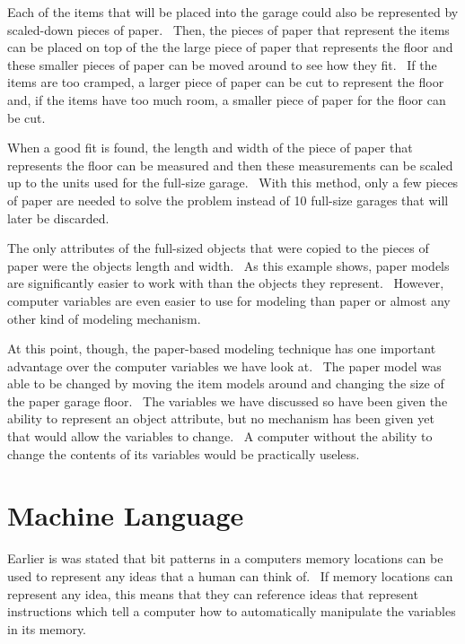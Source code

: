\documentclass[12pt,twoside]{book}
\begin{document}
\bigskip

Each of the items that will be placed into the garage could also be
represented by scaled{}-down pieces of paper. \ Then, the pieces of
paper that represent the items can be placed on top of the the large
piece of paper that represents the floor and these smaller pieces of
paper can be moved around to see how they fit. \ If the items are too
cramped, a larger piece of paper can be cut to represent the floor and,
if the items have too much room, a smaller piece of paper for the floor
can be cut.


\bigskip

When a good fit is found, the length and width of the piece of paper
that represents the floor can be measured and then these measurements
can be scaled up to the units used for the full{}-size garage. \ With
this method, only a few pieces of paper are needed to solve the problem
instead of 10 full{}-size garages that will later be discarded.


\bigskip

The only attributes of the full{}-sized objects that were copied to the
pieces of paper were the object{\textquotesingle}s length and width.
\ As this example shows, paper models are significantly easier to work
with than the objects they represent. \ However, computer variables are
even easier to use for modeling than paper or almost any other kind of
modeling mechanism. \ 


\bigskip

At this point, though, the paper{}-based modeling technique has one
important advantage over the computer variables we have look at. \ The
paper model was able to be changed by moving the item models around and
changing the size of the paper garage floor. \ The variables we have
discussed so have been given the ability to represent an object
attribute, but no mechanism has been given yet that would allow the
variable{\textquotesingle}s to change. \ A computer without the ability
to change the contents of its variables would be practically useless.

\section[Machine Language]{Machine Language}
Earlier is was stated that bit patterns in a computer{\textquotesingle}s
memory locations can be used to represent any ideas that a human can
think of. \ If memory locations can represent any idea, this means that
they can reference ideas that represent instructions which tell a
computer how to automatically manipulate the variables in its memory.
\end{document}
